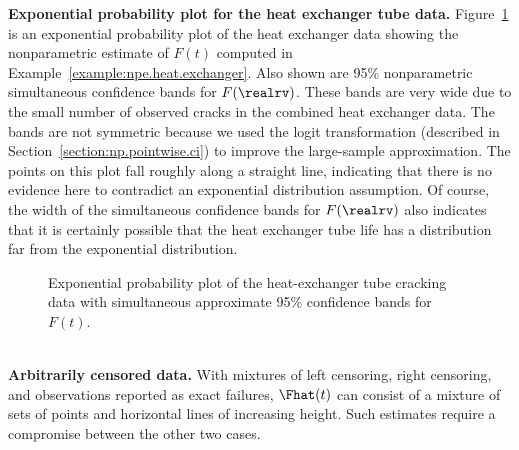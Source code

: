 \begin{example}
{\bf Exponential probability plot for the heat exchanger tube data.}
Figure~\ref{figure:heatexch.npp.exp.ps} is an exponential
probability plot of the heat exchanger data showing the
nonparametric estimate of $F(t)$ computed in
Example~\ref{example:npe.heat.exchanger}.  Also shown are 95\%
nonparametric simultaneous confidence bands for $F(\realrv)$. These
bands are very wide due to the small number of observed cracks in
the combined heat exchanger data.  The bands are not symmetric
because we used the logit transformation (described in
Section~\ref{section:np.pointwise.ci}) to improve the large-sample
approximation.  The points on this plot fall roughly along a
straight line, indicating that there is no evidence here to
contradict an exponential distribution assumption. Of course, the
width of the simultaneous confidence bands for $F(\realrv)$ also
indicates that it is certainly possible that the heat exchanger tube
life has a distribution far from the exponential distribution.
\begin{figure}
\caption{Exponential probability plot of the heat-exchanger
tube cracking data with 
simultaneous approximate 95\% confidence bands for $F(t)$.}
\label{figure:heatexch.npp.exp.ps}
\end{figure}
\end{example}

\mbox{ }\\
\noindent
{\bf Arbitrarily censored data.}  With mixtures of left censoring,
right censoring, and observations reported as exact failures,
$\Fhat(t)$ can consist of a mixture of sets of points and horizontal
lines of increasing height.  Such estimates require a compromise
between the other two cases.

